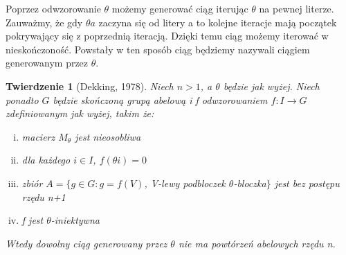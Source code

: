 \documentclass[12pt,a4paper]{amsart}
\newtheorem{theorem}{Twierdzenie}
\begin{document}
Poprzez odwzorowanie $\theta$ możemy generować ciąg iterując $\theta$ na pewnej literze. Zauważmy, że gdy $\theta a$ zaczyna się od litery a to kolejne iteracje mają początek pokrywający się z poprzednią iteracją. Dzięki temu ciąg możemy iterować w nieskończoność. Powstały w ten sposób ciąg będziemy nazywali ciągiem generowanym przez $\theta$.

\newpage
\begin{theorem}[Dekking, 1978]
Niech $n>1$, a $\theta$ będzie jak wyżej. Niech ponadto $G$ będzie skończoną grupą abelową i f odwzorowaniem $f: I \rightarrow G$ zdefiniowanym jak wyżej, takim że:
\begin{enumerate}[(i)]
\item macierz $M_{\theta}$ jest nieosobliwa
\item dla każdego $i \in I$, $f(\theta i)=0$
\item zbiór $A = \{g \in G: g=f(V)$, V-lewy podbloczek $\theta$-bloczka$\}$ jest bez postępu rzędu n+1
\item f jest $\theta$-iniektywna
\end{enumerate}
Wtedy dowolny ciąg generowany przez $\theta$ nie ma powtórzeń abelowych rzędu n.
\end{theorem}
\end{document}
